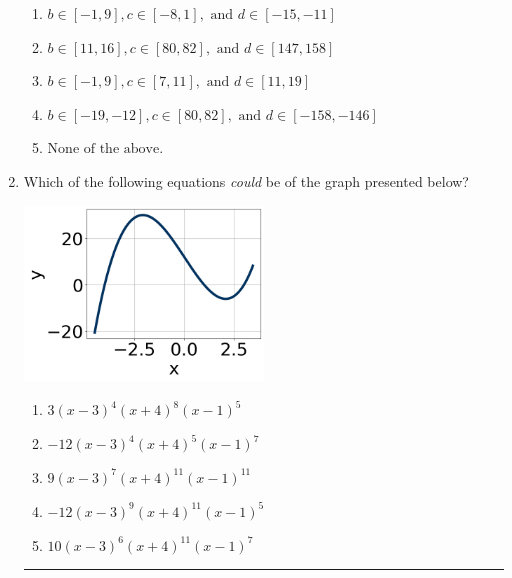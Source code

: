 \documentclass[14pt]{extbook}
\newcommand{\litem}[1]{\item#1\hspace*{-1cm}\rule{\textwidth}{0.4pt}}
\begin{document}
\begin{enumerate}
{\begin{enumerate}[label=\Alph*.]
\item \( b \in [-1, 9], c \in [-8, 1], \text{ and } d \in [-15, -11] \)
\item \( b \in [11, 16], c \in [80, 82], \text{ and } d \in [147, 158] \)
\item \( b \in [-1, 9], c \in [7, 11], \text{ and } d \in [11, 19] \)
\item \( b \in [-19, -12], c \in [80, 82], \text{ and } d \in [-158, -146] \)
\item \( \text{None of the above.} \)

\end{enumerate} }
\litem{
Which of the following equations \textit{could} be of the graph presented below?
\begin{center}
    \includegraphics[width=0.5\textwidth]{../Figures/polyGraphToFunctionCopyB.png}
\end{center}
\begin{enumerate}[label=\Alph*.]
\item \( 3(x - 3)^{4} (x + 4)^{8} (x - 1)^{5} \)
\item \( -12(x - 3)^{4} (x + 4)^{5} (x - 1)^{7} \)
\item \( 9(x - 3)^{7} (x + 4)^{11} (x - 1)^{11} \)
\item \( -12(x - 3)^{9} (x + 4)^{11} (x - 1)^{5} \)
\item \( 10(x - 3)^{6} (x + 4)^{11} (x - 1)^{7} \)


\end{enumerate}}
\end{enumerate}
\end{document}
